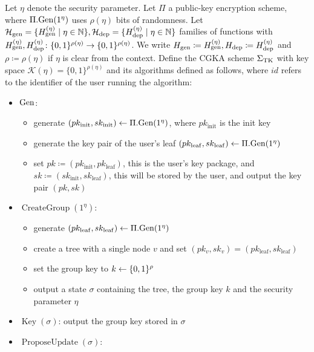 \begin{definition} Let $\eta$ denote the security parameter. Let $\Pi$ a public-key encryption scheme, where $\Pi.\mathrm{Gen}(1^\eta)$ uses $\rho(\eta)$ bits of randomness. Let $\mathcal{H}_\mathrm{gen} = \{ H_\mathrm{gen}^{(\eta)} \mid \eta \in \mathbb{N}\}, \mathcal{H}_\mathrm{dep} = \{ H_\mathrm{dep}^{(\eta)} \mid \eta \in \mathbb{N}\}$ families of functions with $H_\mathrm{gen}^{(\eta)}, H_\mathrm{dep}^{(\eta)} \colon \{0, 1\}^{\rho(\eta)} \to \{0, 1\}^{\rho(\eta)}$. We write $H_\mathrm{gen} \coloneqq H_\mathrm{gen}^{(\eta)}, H_\mathrm{dep} \coloneqq H_\mathrm{dep}^{(\eta)}$ and $\rho \coloneqq \rho(\eta)$ if $\eta$ is clear from the context. Define the CGKA scheme $\Sigma_{\mathrm{TK}}$ with key space $\mathcal{K}(\eta) = \{0, 1\}^{\rho(\eta)}$ and its algorithms defined as follows, where $id$ refers to the identifier of the user running the algorithm:
	\begin{itemize}
		\item $\mathrm{Gen}$:
		      \begin{itemize}
			      \item generate $(pk_{\mathrm{init}}, sk_{\mathrm{init}}) \leftarrow \Pi.\mathrm{Gen}(1^\eta)$, where $pk_{\mathrm{init}}$ is the init key
			      \item generate the key pair of the user's leaf $(pk_{\mathrm{leaf}}, sk_{\mathrm{leaf}}) \leftarrow \Pi.\mathrm{Gen}(1^\eta)$
			      \item set $pk \coloneqq (pk_{\mathrm{init}}, pk_{\mathrm{leaf}})$, this is the user's key package, and $sk \coloneqq (sk_{\mathrm{init}}, sk_{\mathrm{leaf}})$, this will be stored by the user, and output the key pair $(pk, sk)$
		      \end{itemize}
		\item $\operatorname{CreateGroup}(1^\eta)$:
		      \begin{itemize}
			      \item generate $(pk_{\mathrm{leaf}}, sk_{\mathrm{leaf}}) \leftarrow \Pi.\mathrm{Gen}(1^\eta)$
			      \item create a tree with a single node $v$ and set $(pk_v, sk_v) = (pk_{\mathrm{leaf}}, sk_{\mathrm{leaf}})$
			      \item set the group key to $k \leftarrow \{0, 1\}^\rho$
			      \item output a state $\sigma$ containing the tree, the group key $k$ and the security parameter $\eta$
		      \end{itemize}
		\item $\operatorname{Key}(\sigma)$: output the group key stored in $\sigma$
		\item $\operatorname{ProposeUpdate}(\sigma)$:

\end{itemize}
\end{definition}
